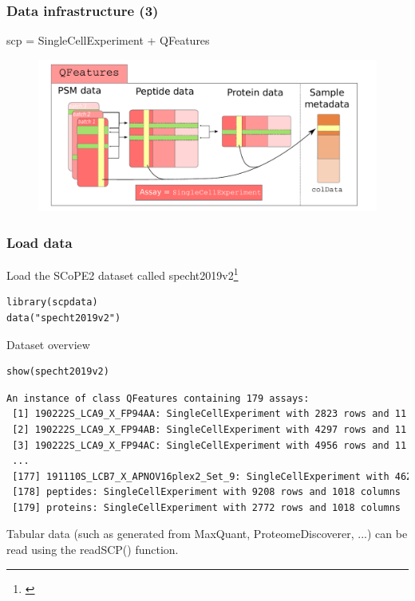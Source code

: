 \documentclass{beamer}
\newcommand{\hcode}[2][lgray]{{\ttfamily\color{vdgray}\colorbox{#1}{#2}}}
\newcommand{\frametitlesection}[1]{\frametitle{\centering #1 \footnotesize \hspace{0pt plus 1 filll} \insertsection}}
\begin{document}
\begin{frame}
    \frametitlesection{Data infrastructure (3)}

    \hcode{scp} = \hcode{SingleCellExperiment} + \hcode{QFeatures}
    \begin{figure}
        \centering
        \includegraphics[width=\linewidth]{figs/SCP_framework.pdf}
    \end{figure}


\end{frame}

\begin{frame}[fragile]
    \frametitlesection{Load data}

    Load the SCoPE2 dataset called \hcode{specht2019v2}\footnote{\citet{Specht2019-jm}}

    \begin{lstlisting}
library(scpdata)
data("specht2019v2")
    \end{lstlisting}

    Dataset overview

    \begin{lstlisting}
show(specht2019v2)
    \end{lstlisting}

    \begin{lstlisting}[language = TeX, numbers = none, basicstyle = \tiny\ttfamily\color{vdgray}]
An instance of class QFeatures containing 179 assays:
 [1] 190222S_LCA9_X_FP94AA: SingleCellExperiment with 2823 rows and 11 col...
 [2] 190222S_LCA9_X_FP94AB: SingleCellExperiment with 4297 rows and 11 col...
 [3] 190222S_LCA9_X_FP94AC: SingleCellExperiment with 4956 rows and 11 col...
 ...
 [177] 191110S_LCB7_X_APNOV16plex2_Set_9: SingleCellExperiment with 4626 r...
 [178] peptides: SingleCellExperiment with 9208 rows and 1018 columns
 [179] proteins: SingleCellExperiment with 2772 rows and 1018 columns
    \end{lstlisting}

    \bigskip
    \footnotesize

    Tabular data (such as generated from MaxQuant, ProteomeDiscoverer,
    ...) can be read using the \hcode{readSCP()} function.

\end{frame}
\end{document}
